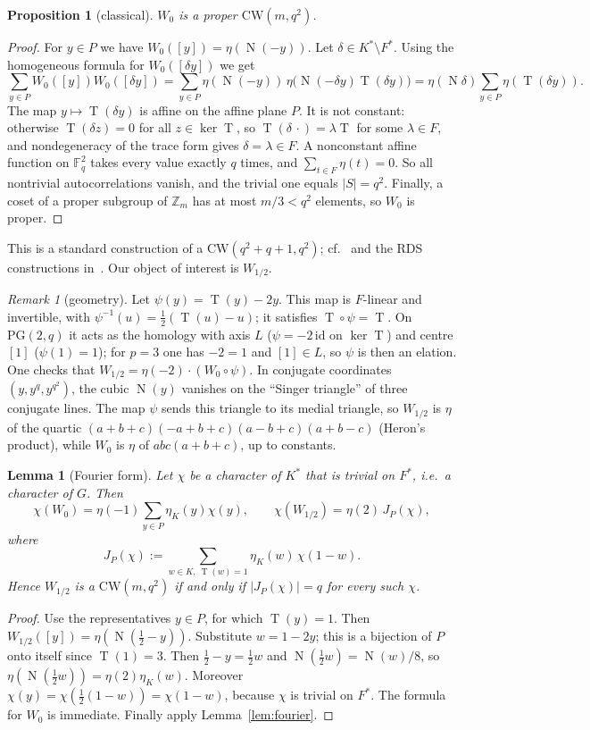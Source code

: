 \documentclass[11pt]{article}
\numberwithin{equation}{section}
\newtheorem{proposition}[theorem]{Proposition}
\newtheorem{lemma}[theorem]{Lemma}
\theoremstyle{definition}
\theoremstyle{remark}
\newtheorem{remark}[theorem]{Remark}
\newcommand{\Z}{\mathbb Z}
\newcommand{\F}{\mathbb F}
\newcommand{\CW}{\mathrm{CW}}
\DeclareMathOperator{\Tr}{T}
\DeclareMathOperator{\Nm}{N}
\begin{document}
\begin{proposition}[classical]\label{prop:classical}
$W_0$ is a proper $\CW(m,q^2)$.
\end{proposition}
\begin{proof}
For $y\in P$ we have $W_0([y])=\eta(\Nm(-y))$. Let $\delta\in K^*\setminus F^*$. Using the
homogeneous formula for $W_0([\delta y])$ we get
\[
\sum_{y\in P}W_0([y])W_0([\delta y])
 =\sum_{y\in P}\eta(\Nm(-y))\,\eta\bigl(\Nm(-\delta y)\Tr(\delta y)\bigr)
 =\eta(\Nm\delta)\sum_{y\in P}\eta(\Tr(\delta y)).
\]
The map $y\mapsto \Tr(\delta y)$ is affine on the affine plane $P$. It is not constant: otherwise
$\Tr(\delta z)=0$ for all $z\in\ker \Tr$, so $\Tr(\delta\,\cdot)=\lambda \Tr$ for some
$\lambda\in F$, and nondegeneracy of the trace form gives $\delta=\lambda\in F$. A
nonconstant affine function on $\F_q^2$ takes every value exactly $q$ times, and
$\sum_{t\in F}\eta(t)=0$. So all nontrivial autocorrelations vanish, and the trivial one equals
$|S|=q^2$. Finally, a coset of a proper subgroup of $\Z_m$ has at most $m/3<q^2$ elements, so
$W_0$ is proper.
\end{proof}

This is a standard construction of a $\CW(q^2+q+1,q^2)$; cf.~\cite[Theorem~4]{AS98} and the
RDS constructions in~\cite{G26}. Our object of interest is $W_{1/2}$.

\begin{remark}[geometry]\label{rem:geometry}
Let $\psi(y)=\Tr(y)-2y$. This map is $F$-linear and invertible, with
$\psi^{-1}(u)=\tfrac12(\Tr(u)-u)$; it satisfies $\Tr\circ\psi=\Tr$. On $\mathrm{PG}(2,q)$ it acts
as the homology with axis $L$ ($\psi=-2\,\mathrm{id}$ on $\ker \Tr$) and centre $[1]$
($\psi(1)=1$); for $p=3$ one has $-2=1$ and $[1]\in L$, so $\psi$ is then an elation. One checks
that $W_{1/2}=\eta(-2)\cdot(W_0\circ\psi)$.
In conjugate coordinates $(y,y^q,y^{q^2})$, the cubic $\Nm(y)$ vanishes on the ``Singer
triangle'' of three conjugate lines. The map $\psi$ sends this triangle to its medial triangle,
so $W_{1/2}$ is $\eta$ of the quartic $(a+b+c)(-a+b+c)(a-b+c)(a+b-c)$ (Heron's product), while
$W_0$ is $\eta$ of $abc(a+b+c)$, up to constants.
\end{remark}

\begin{lemma}[Fourier form]\label{lem:jacobi}
Let $\chi$ be a character of $K^*$ that is trivial on $F^*$, i.e.\ a character of $G$. Then
\[
\chi(W_0)=\eta(-1)\sum_{y\in P}\eta_K(y)\chi(y),\qquad
\chi(W_{1/2})=\eta(2)\,J_P(\chi),
\]
where
\[
J_P(\chi):=\sum_{w\in K,\ \Tr(w)=1}\eta_K(w)\,\chi(1-w).
\]
Hence $W_{1/2}$ is a $\CW(m,q^2)$ if and only if $|J_P(\chi)|=q$ for every such $\chi$.
\end{lemma}
\begin{proof}
Use the representatives $y\in P$, for which $\Tr(y)=1$. Then
$W_{1/2}([y])=\eta(\Nm(\tfrac12-y))$. Substitute $w=1-2y$; this is a bijection of $P$ onto itself
since $\Tr(1)=3$. Then $\tfrac12-y=\tfrac12w$ and $\Nm(\tfrac12 w)=\Nm(w)/8$, so
$\eta(\Nm(\tfrac12w))=\eta(2)\eta_K(w)$. Moreover $\chi(y)=\chi(\tfrac12(1-w))=\chi(1-w)$,
because $\chi$ is trivial on $F^*$. The formula for $W_0$ is immediate. Finally apply
Lemma~\ref{lem:fourier}.
\end{proof}
\end{document}
